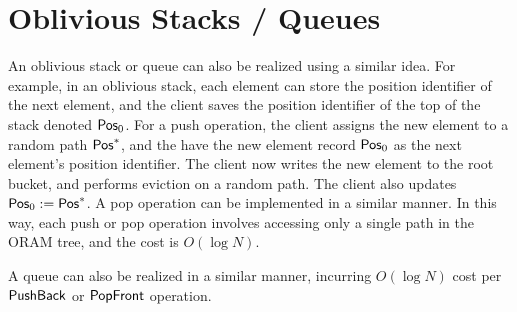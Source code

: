 \documentclass[11pt]{article}
\begin{document}
\section{Oblivious Stacks / Queues}
An oblivious stack or queue can also be realized
using a similar idea.
For example, in an oblivious stack,
each element can store the position identifier
of the next element, and the client saves
the position identifier of the top of the stack denoted ${\sf Pos}_0$.
For a push operation, the client 
assigns the new element to a random path ${\sf Pos}^*$, 
and the have the new element record
${\sf Pos}_0$ as the next element's position identifier. 
The client now writes the new element to the root bucket,
and performs eviction on a random path.
The client also updates ${\sf Pos}_0 := {\sf Pos}^*$.
A pop operation can be implemented in a similar manner.
In this 
way, 
each push or pop operation involves
accessing only a single path in the ORAM tree,
and the cost is $O(\log N)$.


A queue can also be realized in a similar
manner, incurring $O(\log N)$ cost per ${\sf PushBack}$ or
${\sf PopFront}$ operation.
\end{document}
